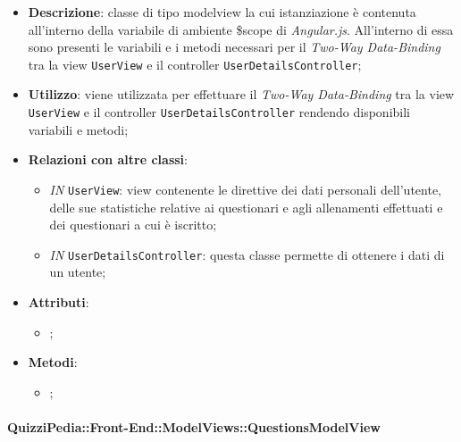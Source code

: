 		\begin{itemize}
			\item \textbf{Descrizione}: classe di tipo modelview la cui istanziazione è contenuta all'interno della variabile di ambiente \$scope di \textit{Angular.js}. All'interno di essa sono presenti le variabili e i metodi necessari per il \textit{Two-Way Data-Binding} tra la view \texttt{UserView} e il controller \texttt{UserDetailsController};
			\item \textbf{Utilizzo}: viene utilizzata per effettuare il \textit{Two-Way Data-Binding} tra la view \texttt{UserView} e il controller \texttt{UserDetailsController} rendendo disponibili variabili e metodi;
			\item \textbf{Relazioni con altre classi}: 
			\begin{itemize}
				\item \textit{IN} \texttt{UserView}: view contenente le direttive dei dati personali dell'utente, delle sue statistiche relative ai questionari e agli allenamenti effettuati e dei questionari a cui è iscritto; 
				\item \textit{IN} \texttt{UserDetailsController}: questa classe permette di ottenere i dati di un utente;
			\end{itemize}
			\item \textbf{Attributi}: 
			\begin{itemize}
				\item ;
			\end{itemize}
			\item \textbf{Metodi}: 
			\begin{itemize}
				\item ;
			\end{itemize}
		\end{itemize}
		
			\paragraph{QuizziPedia::Front-End::ModelViews::QuestionsModelView}
			
			\label{QuizziPedia::Front-End::ModelViews::QuestionsModelView}
			
